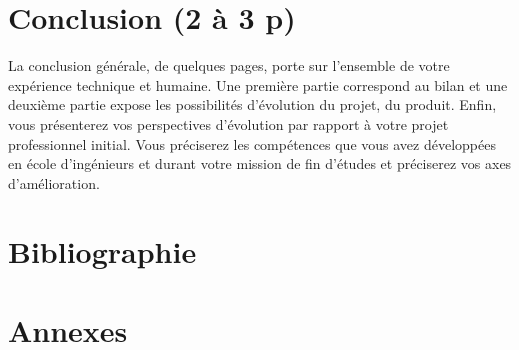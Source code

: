 \documentclass[11pt]{article}
\begin{document}
  \pagebreak
  \section{Conclusion (2 à 3 p)}
  La conclusion générale, de quelques pages, porte sur l’ensemble de votre expérience technique et
  humaine. Une première partie correspond au bilan et une deuxième partie expose les possibilités
  d’évolution du projet, du produit. Enfin, vous présenterez vos perspectives d’évolution par rapport à
  votre projet professionnel initial. Vous préciserez les compétences que vous avez développées en
  école d’ingénieurs et durant votre mission de fin d’études et préciserez vos axes d’amélioration.

  \pagebreak
  \section{Bibliographie}

  \printbibliography[heading=none]

  \pagebreak
  \section{Annexes}
 
  \printnoidxglossary[type=acronym]
  \printacronyms
 
\end{document}
